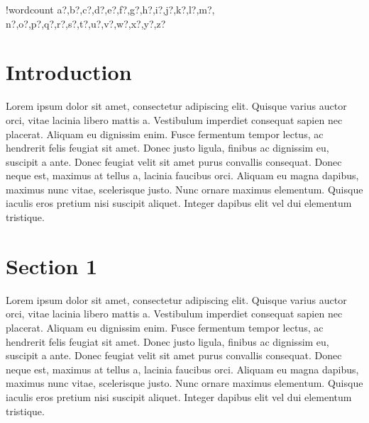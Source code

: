 \documentclass{article}
\newcounter{words}
\newenvironment{counted}{%
  \setcounter{words}{0}
  \SearchList!{wordcount}{\stepcounter{words}}
    {a?,b?,c?,d?,e?,f?,g?,h?,i?,j?,k?,l?,m?,
    n?,o?,p?,q?,r?,s?,t?,u?,v?,w?,x?,y?,z?}
  \UndoBoundary{'}
  \SearchOrder{p;}}{%
  \StopSearching}
\begin{document}
\begin{abstract}
\end{abstract}
\tableofcontents
\newpage
\begin{counted} %

\section{Introduction}
Lorem ipsum dolor sit amet, consectetur adipiscing elit. Quisque varius auctor orci, vitae lacinia libero mattis a. Vestibulum imperdiet consequat sapien nec placerat. Aliquam eu dignissim enim. Fusce fermentum tempor lectus, ac hendrerit felis feugiat sit amet. Donec justo ligula, finibus ac dignissim eu, suscipit a ante. Donec feugiat velit sit amet purus convallis consequat. Donec neque est, maximus at tellus a, lacinia faucibus orci. Aliquam eu magna dapibus, maximus nunc vitae, scelerisque justo. Nunc ornare maximus elementum. Quisque iaculis eros pretium nisi suscipit aliquet. Integer dapibus elit vel dui elementum tristique.
\section{Section 1}
Lorem ipsum dolor sit amet, consectetur adipiscing elit. Quisque varius auctor orci, vitae lacinia libero mattis a. Vestibulum imperdiet consequat sapien nec placerat. Aliquam eu dignissim enim. Fusce fermentum tempor lectus, ac hendrerit felis feugiat sit amet. Donec justo ligula, finibus ac dignissim eu, suscipit a ante. Donec feugiat velit sit amet purus convallis consequat. Donec neque est, maximus at tellus a, lacinia faucibus orci. Aliquam eu magna dapibus, maximus nunc vitae, scelerisque justo. Nunc ornare maximus elementum. Quisque iaculis eros pretium nisi suscipit aliquet. Integer dapibus elit vel dui elementum tristique.

\end{counted}
\end{document}
